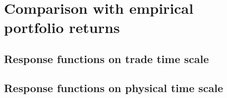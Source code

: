 \section{Comparison with empirical portfolio returns}
\label{sec:comparison_returns}



\subsection{Response functions on trade time scale}
\label{subsec:response_function_trade}



\subsection{Response functions on physical time scale}
\label{subsec:response_function_physical}
